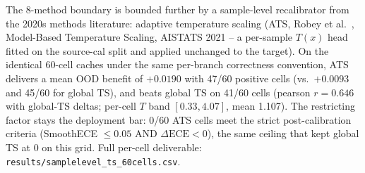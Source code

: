 \documentclass[final,5p,times,nonatbib]{elsarticle}
\begin{document}
\begin{table}[tb]
\centering
\caption{Architecture robustness for TS: InceptionTime vs.\ ResNet1D
across 6 transfer pairs, full 5-seed coverage on both architectures.
Architecture robustness is supported on both InceptionTime (24/30, 80.0\%)
and ResNet1D (21/30, 70.0\%) with complete 5-seed coverage on all 6
directions. ResNet1D shows direction-specific deficits on
CPSC$\rightarrow$Chapman and CPSC$\rightarrow$PTB-XL (3/5 each) and
PTB-XL$\rightarrow$CPSC (2/5), not
a global architecture deficit.}
\label{tab:arch_robust}
\end{table}

The 8-method boundary is bounded further by a sample-level recalibrator
from the 2020s methods literature: adaptive temperature scaling
(ATS, Robey et al.~\cite{robey2021adaptive}, Model-Based Temperature
Scaling, AISTATS 2021 -- a per-sample $T(x)$ head fitted on the
source-cal split and applied unchanged to the target). On the identical
60-cell caches under the same per-branch correctness convention, ATS
delivers a mean OOD benefit of $+0.0190$ with 47/60 positive cells
(vs.\ $+0.0093$ and 45/60 for global TS), and beats global TS on 41/60
cells (pearson $r=0.646$ with global-TS deltas; per-cell $T$ band
$[0.33, 4.07]$, mean 1.107). The restricting factor stays the
deployment bar: 0/60 ATS cells meet the strict post-calibration
criteria (SmoothECE $\leq 0.05$ AND $\Delta\text{ECE}<0$), the same
ceiling that kept global TS at 0 on this grid. Full per-cell
deliverable: \texttt{results/samplelevel\_ts\_60cells.csv}.
\end{document}
